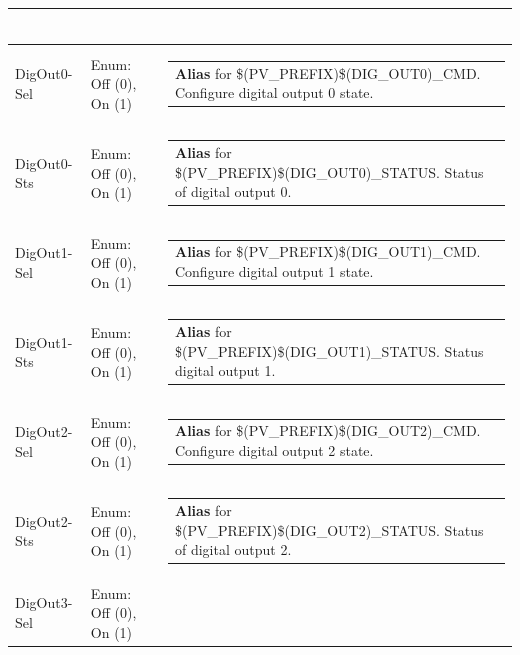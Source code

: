 \documentclass[openany]{article}
\begin{document}
\begin{longtable}{| m{4.5cm} m{2.5cm}  m{8.5cm} |}
\begin{tabular}{@{}m{6cm}@{}}
            \end{tabular} \hypertarget{pv:dig-out-0}{}\\ \hline
        DigOut0-Sel & Enum: Off (0), On (1) & \begin{tabular}{@{}m{6cm}@{}}
                \textbf{\color{blue} Alias} for \$(PV\_PREFIX)\$(DIG\_OUT0)\_CMD. Configure digital output 0 state.
            \end{tabular} \hypertarget{}{}\\ \hline
        DigOut0-Sts & Enum: Off (0), On (1) & \begin{tabular}{@{}m{6cm}@{}}
                \textbf{\color{blue} Alias} for \$(PV\_PREFIX)\$(DIG\_OUT0)\_STATUS. Status of digital output 0.
            \end{tabular} \hypertarget{pv:dig-out-1}{}\\ \hline
        DigOut1-Sel & Enum: Off (0), On (1) & \begin{tabular}{@{}m{6cm}@{}}
                \textbf{\color{blue} Alias} for \$(PV\_PREFIX)\$(DIG\_OUT1)\_CMD. Configure digital output 1 state.
            \end{tabular} \hypertarget{}{}\\ \hline
        DigOut1-Sts & Enum: Off (0), On (1) & \begin{tabular}{@{}m{6cm}@{}}
                \textbf{\color{blue} Alias} for \$(PV\_PREFIX)\$(DIG\_OUT1)\_STATUS. Status digital output 1.
            \end{tabular} \hypertarget{pv:dig-out-2}{}\\ \hline
        DigOut2-Sel & Enum: Off (0), On (1) & \begin{tabular}{@{}m{6cm}@{}}
                \textbf{\color{blue} Alias} for \$(PV\_PREFIX)\$(DIG\_OUT2)\_CMD. Configure digital output 2 state.
            \end{tabular} \hypertarget{}{}\\ \hline
        DigOut2-Sts & Enum: Off (0), On (1) & \begin{tabular}{@{}m{6cm}@{}}
                \textbf{\color{blue} Alias} for \$(PV\_PREFIX)\$(DIG\_OUT2)\_STATUS. Status of digital output 2.
            \end{tabular} \hypertarget{pv:dig-out-3}{}\\ \hline
        DigOut3-Sel & Enum: Off (0), On (1) & \begin{tabular}{@{}m{6cm}@{}}

\end{tabular}
\end{longtable}
\end{document}
